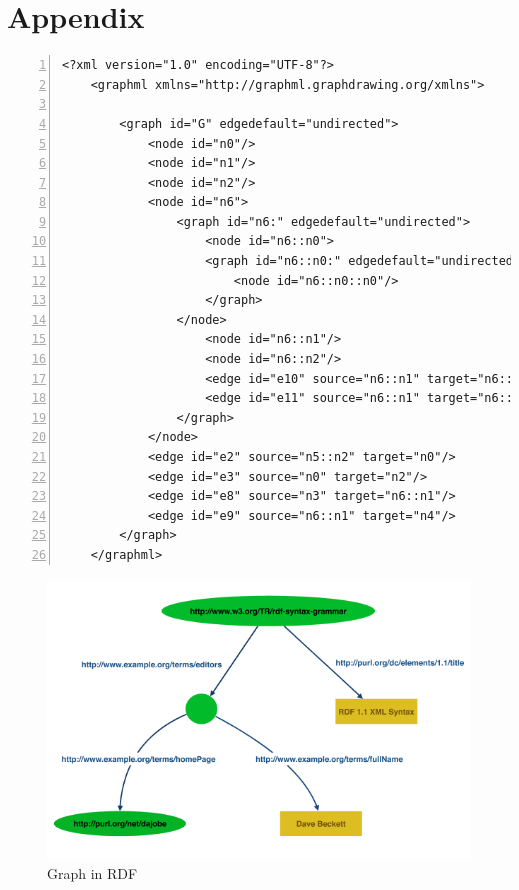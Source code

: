 \chapter{Appendix}
\label{anhang} 
\vspace{-7mm}
\begin{center}
\begin{minipage}{.8\textwidth}
	\begin{lstlisting}[numbers=left,
	stepnumber=1,caption={A Mutiple Nested Graph in GraphML},captionpos=b, linewidth={\textwidth}, escapeinside=||,label=GraphGraphML,gobble=4]
	<?xml version="1.0" encoding="UTF-8"?>
	<graphml xmlns="http://graphml.graphdrawing.org/xmlns">
	
		<graph id="G" edgedefault="undirected">
			<node id="n0"/>
			<node id="n1"/>
			<node id="n2"/>
			<node id="n6">
				<graph id="n6:" edgedefault="undirected">
					<node id="n6::n0">
					<graph id="n6::n0:" edgedefault="undirected">
						<node id="n6::n0::n0"/>
					</graph>
				</node>
					<node id="n6::n1"/>
					<node id="n6::n2"/>
					<edge id="e10" source="n6::n1" target="n6::n0::n0"/>
					<edge id="e11" source="n6::n1" target="n6::n2"/>
				</graph>
			</node>
			<edge id="e2" source="n5::n2" target="n0"/>
			<edge id="e3" source="n0" target="n2"/>
			<edge id="e8" source="n3" target="n6::n1"/>
			<edge id="e9" source="n6::n1" target="n4"/>
		</graph>
	</graphml>
	\end{lstlisting}
\end{minipage}
\end{center}

\begin{figure}
	\centering
	\includegraphics[width=1.0\linewidth]{img/rdf_graph.png}
	\caption{Graph in RDF}
	\label{GraphRDF}
\end{figure}
